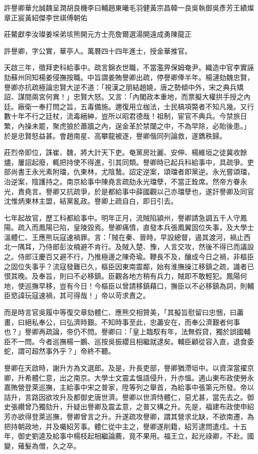 
\begin{pinyinscope}
許譽卿華允誠魏呈潤胡良機李曰輔趙東曦毛羽健黃宗昌韓一良吳執御吳彥芳王績燦章正宸黃紹傑李世祺傅朝佑

莊鰲獻李汝璨姜埰弟垓熊開元方士亮詹爾選湯開遠成勇陳龍正

許譽卿，字公實，華亭人。萬曆四十四年進士，授金華推官。

天啟三年，徵拜吏科給事中。疏言錦衣世職，不當濫畀保姆奄尹。織造中官李實誣劾蘇州同知楊姜侵撫按職。中旨謂姜賄譽卿出疏，停譽卿俸半年。楊漣劾魏忠賢，譽卿亦抗疏極論忠賢大逆不道：「視漢之朋結趙嬈，唐之勢傾中外，宋之典兵矯詔、謀間兩宮何異！」忠賢大怒。又言：「內閣政本重地，而票擬大權拱手授之內廷。廠衛一奉打問之旨，五毒備施。邇復用立枷法，士民槁項斃者不知凡幾。又行數十年不行之廷杖，流毒縉紳，豈所以昭君德哉！祖制，宦官不典兵。今禁旅日繁，內操未罷，聚虎狼於蕭牆之內，逞金革於禁闥之中，不為早除，必貽後患。」於是忠賢怒益甚。會趙南星、高攀龍被逐，譽卿偕同列論救，遂鐫秩歸。

莊烈帝即位，誅崔、魏，將大計天下吏。奄黨房壯麗、安伸、楊維垣之徒冀收餘燼，屢詔起廢，輒把持使不得進，引其同類。譽卿時已起兵科給事中，具疏爭。吏部尚書王永光素附璫，仇東林，尤陰鷙。詔定逆案，頌璫者即黨逆。永光嘗頌璫，治逆案，陰護持之。南京給事中陳堯言疏劾永光璫孽，不當正銓席。然帝方眷永光，責堯言。譽卿又抗疏爭，於是都給事中薛國觀以己亦璫孽也，遂訐譽卿及同官沈惟炳東林主盟，結黨亂政。譽卿上疏自白，即日引去。

七年起故官，歷工科都給事中。明年正月，流賊陷潁州，譽卿請急調五千人守鳳陽。疏入而鳳陽已陷，皇陵毀焉。譽卿痛憤，直發本兵張鳳翼固位失事，及大學士溫體仁、王應熊玩寇速禍罪。言：「賊在秦、晉時，早設總督，遏其渡河，禍止西北一隅耳，乃侍郎彭汝楠避不肯行。及賊入楚、豫，人言交攻，然後不得已而議設之。侍郎汪慶百又避不行，乃推極邊之陳奇瑜。鞭長不及，釀成今日之禍，非樞臣之固位失事乎？流寇發難已久，樞臣因東南震鄰，始有淮撫操江移鎮之疏，識者已恨其晚。及奉旨，則曰不必移鎮。臣觀各地方稍有兵力，賊即不敢輕犯。鳳陽何地，使巡撫早移，豈有今日！今樞臣以曾請移鎮藉口，撫臣以不必移鎮為詞，則輔臣慾諱玩寇速禍，其可得哉！」帝以苛求責之。

而是時言官吳履中等復交章劾體仁、應熊交相贊美，「其擬旨慰留曰忠悃，曰藎畫，曰絕私奉公，曰弘濟時艱。不知時事至此，忠藎安在，而奉公濟艱者何事也？」譽卿再疏論，帝仍不問。譽卿曰：「皇上臨馭有年，法無假貸，獨於誤國輔臣不一問。今者巡撫楊一鵬、巡按吳振纓且相繼就逮矣。輔臣顧從容入直，退食委蛇，謂可超然事外乎？」帝終不聽。

譽卿在天啟時，謝升方為文選郎。及是，升長吏部，譽卿猶滯垣中。以資深當擢京卿，升希體仁意，出之南京。大學士文震孟慍語侵升，升亦慍。適山東布政使勞永嘉賄營登萊巡撫，主給事中宋之普家，陞等列之舉首，為給事中張第元所發。帝以詰升，言路因欲攻升及都御史唐世濟。譽卿以世濟恃體仁，惡尤甚，當先去之。御史張纘曾乃獨劾升，升疑出譽卿及震孟意，之普又構之升。先是，福建布政使申紹芳亦欲得登萊巡撫，譽卿曾言之升。升遂疏攻譽卿，謂其營求北缺，不欲南遷，為把持朝政地，并及囑紹芳事。體仁從中主之，譽卿遂削籍，紹芳逮問遣戍。十五年，御史劉逵及給事中楊枝起相繼論薦，竟不果用。福王立，起光祿卿，不赴。國變，薙髮為僧，久之卒。


\end{pinyinscope}

